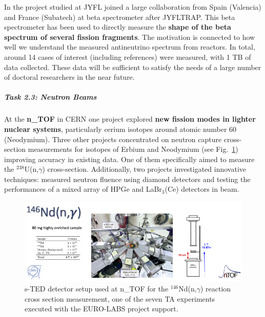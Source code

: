 In the project studied at JYFL joined a large collaboration from Spain (Valencia) and France (Subatech) at beta spectrometer after JYFLTRAP. This beta spectrometer has been used to directly measure the \textbf{shape of the beta spectrum of several fission fragments}. The motivation is connected to how well we understand the measured antineutrino spectrum from reactors.
In total, around 14 cases of interest (including references) were measured, with 1 TB of data collected. These data will be sufficient to satisfy the needs of a large number of doctoral researchers in the near future.


\subparagraph{Task 2.3: Neutron Beams} \mbox{}

At the \textbf{n\_TOF} in CERN one project explored \textbf{new fission modes in lighter nuclear systems}, particularly cerium isotopes around atomic number 60 (Neodymium). Three other projects concentrated on neutron capture cross-section measurements for isotopes of Erbium and Neodymium (see Fig.~\ref{fig:n_TOF-146Nd})  improving accuracy in existing data. One of them specifically aimed to measure the $^{238}$U(n,$\gamma$) cross-section. Additionally, two projects investigated innovative techniques: measured neutron fluence using diamond detectors and testing the performances of a mixed array of HPGe and LaBr$_3$(Ce) detectors in beam.


\begin{figure}[!h]
    \centering
    \includegraphics[width=1.0\linewidth]{graphics/n_TOF-146Nd.png}
    \caption{s-TED detector setup used at n\_TOF for the $^{146}$Nd(n,$\gamma$) reaction cross section measurement, one of the seven TA experiments executed with the EURO-LABS project support.}
    \label{fig:n_TOF-146Nd}
\end{figure}

